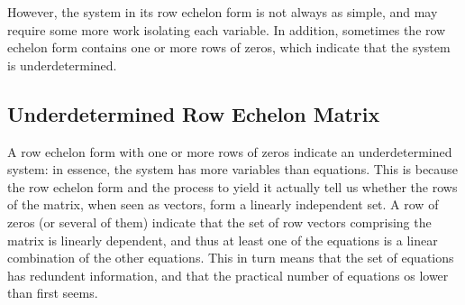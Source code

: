 However, the system in its row echelon form is not always as simple, and may require some more work isolating each variable. In addition, sometimes the row echelon form contains one or more rows of zeros, which indicate that the system is underdetermined.

\subsection{Underdetermined Row Echelon Matrix}
A row echelon form with one or more rows of zeros indicate an underdetermined system: in essence, the system has more variables than equations. This is because the row echelon form and the process to yield it actually tell us whether the rows of the matrix, when seen as vectors, form a linearly independent set. A row of zeros (or several of them) indicate that the set of row vectors comprising the matrix is linearly dependent, and thus at least one of the equations is a linear combination of the other equations. This in turn means that the set of equations has redundent information, and that the practical number of equations os lower than first seems.

